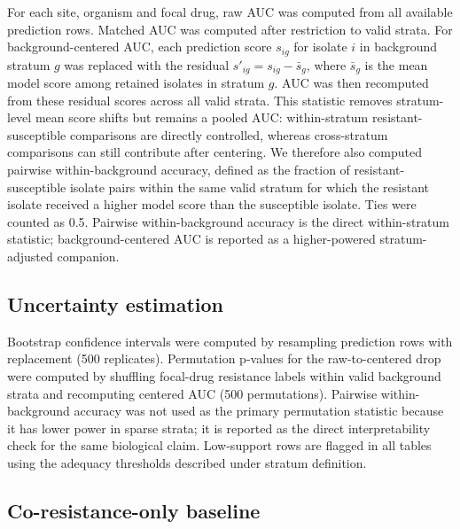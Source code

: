\documentclass[11pt]{article}
\begin{document}
For each site, organism and focal drug, raw AUC was computed from all available prediction rows. Matched AUC was computed after restriction to valid strata. For background-centered AUC, each prediction score $s_{ig}$ for isolate $i$ in background stratum $g$ was replaced with the residual $s'_{ig}=s_{ig}-\bar{s}_g$, where $\bar{s}_g$ is the mean model score among retained isolates in stratum $g$. AUC was then recomputed from these residual scores across all valid strata. This statistic removes stratum-level mean score shifts but remains a pooled AUC: within-stratum resistant-susceptible comparisons are directly controlled, whereas cross-stratum comparisons can still contribute after centering. We therefore also computed pairwise within-background accuracy, defined as the fraction of resistant-susceptible isolate pairs within the same valid stratum for which the resistant isolate received a higher model score than the susceptible isolate. Ties were counted as 0.5. Pairwise within-background accuracy is the direct within-stratum statistic; background-centered AUC is reported as a higher-powered stratum-adjusted companion.

\subsection*{Uncertainty estimation}

Bootstrap confidence intervals were computed by resampling prediction rows with replacement (500 replicates). Permutation p-values for the raw-to-centered drop were computed by shuffling focal-drug resistance labels within valid background strata and recomputing centered AUC (500 permutations). Pairwise within-background accuracy was not used as the primary permutation statistic because it has lower power in sparse strata; it is reported as the direct interpretability check for the same biological claim. Low-support rows are flagged in all tables using the adequacy thresholds described under stratum definition.

\subsection*{Co-resistance-only baseline}
\end{document}
